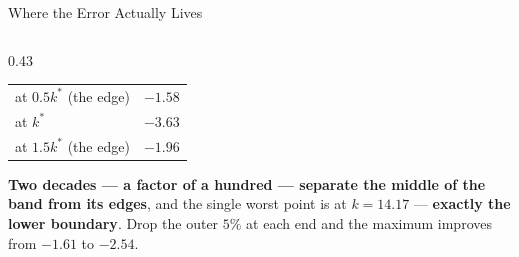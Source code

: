 \begin{frame}{Where the Error Actually Lives}
\begin{columns}[T]
\begin{column}{0.43\textwidth}
\begin{center}
\begin{tabularx}{\linewidth}{@{}>{\raggedright\arraybackslash}X >{\raggedleft\arraybackslash}p{2.0cm}@{}}
\midrule
at $0.5k^{*}$ (the edge) & $-1.58$ \\
at $k^{*}$ & $\mathbf{-3.63}$ \\
at $1.5k^{*}$ (the edge) & $-1.96$ \\
\bottomrule
\end{tabularx}
\end{center}
\medskip
\begin{takeawaybox}\footnotesize
\textbf{Two decades --- a factor of a hundred --- separate the middle of the band from its edges}, and the single worst point is at $k=14.17$ --- \textbf{exactly the lower boundary}.
\medskip
Drop the outer $5\%$ at each end and the maximum improves from $-1.61$ to $-2.54$.
\end{takeawaybox}
\end{column}
\end{columns}
\vspace{1mm}
\end{frame}

